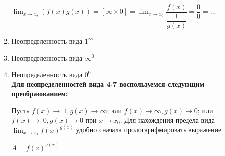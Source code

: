 \documentclass[oneside]{book}
\begin{document}
\begin{itemize}
\begin{enumerate}
	$\lim_{x \to x_{0}} (f(x)g(x))=
	[\infty\times 0]=
	\lim_{x \to x_{0}} \dfrac{f(x)}{\dfrac{1}{g(x)}}=
	\dfrac{0}{0}=...$

	\item Неопределенность вида $1^{\infty}$
	\item Неопределенность вида $\infty^{0}$
	\item Неопределенность вида $0^{0}$\\

	\textbf{Для неопределенностей вида 4-7 воспользуемся следующим преобразованием:}

	Пусть $f(x)\to\ 1, g(x)\to\infty$; или $f(x)\to\infty, g(x)\to 0$; или $f(x)\to\ 0, g(x)\to 0$ при $x\to x_{0}$. Для нахождения предела вида $\lim_{x\to x_{0}} f(x)^{g(x)}$ удобно сначала прологарифмировать выражение
	 \begin{center}
		$A=f(x)^{g(x)}$
	\end{center}

  \setcounter{chapter}{25}         

\end{enumerate}
\end{itemize}
\end{document}

